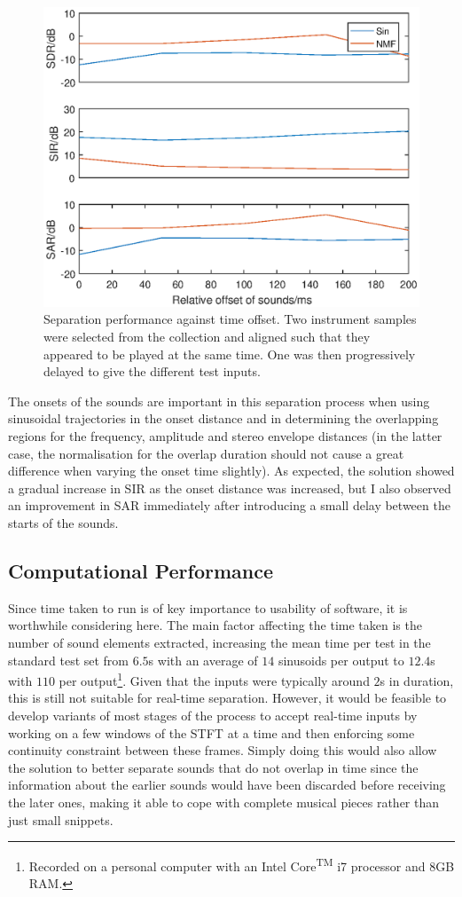 \documentclass[12pt,a4paper,twoside,openright]{report}
\begin{document}
\begin{figure}
\centering
\includegraphics[width=0.7\linewidth]{./OffsetPlot}
\caption[Separation performance against time offset.]{Separation performance against time offset. Two instrument samples were selected from the collection and aligned such that they appeared to be played at the same time. One was then progressively delayed to give the different test inputs.}
\label{fig:OffsetPlot}
\end{figure}

The onsets of the sounds are important in this separation process when using sinusoidal trajectories in the onset distance and in determining the overlapping regions for the frequency, amplitude and stereo envelope distances (in the latter case, the normalisation for the overlap duration should not cause a great difference when varying the onset time slightly). As expected, the solution showed a gradual increase in SIR as the onset distance was increased, but I also observed an improvement in SAR immediately after introducing a small delay between the starts of the sounds.

{\color{red}\subsection*{Computational Performance}

Since time taken to run is of key importance to usability of software, it is worthwhile considering here. The main factor affecting the time taken is the number of sound elements extracted, increasing the mean time per test in the standard test set from $ 6.5 $s with an average of $ 14 $ sinusoids per output to $ 12.4 $s with $ 110 $ per output\footnote{Recorded on a personal computer with an Intel\textsuperscript{\textregistered} Core\textsuperscript{TM} i7 processor and 8GB RAM.}. Given that the inputs were typically around $ 2 $s in duration, this is still not suitable for real-time separation. However, it would be feasible to develop variants of most stages of the process to accept real-time inputs by working on a few windows of the STFT at a time and then enforcing some continuity constraint between these frames. Simply doing this would also allow the solution to better separate sounds that do not overlap in time since the information about the earlier sounds would have been discarded before receiving the later ones, making it able to cope with complete musical pieces rather than just small snippets.}
\end{document}
